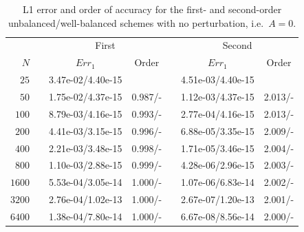 \begin{table}\centering
\caption{L1 error and order of accuracy for the first- and second-order unbalanced/well-balanced schemes with no perturbation, i.e.\ $A=0$.}
\label{table:OVS_A0}
\begin{tabular}{@{}rcccccc@{}}\toprule
& \phantom{a} & \multicolumn{2}{c}{First} & \phantom{ab} & \multicolumn{2}{c}{Second}\\
\cmidrule{3-4} \cmidrule{6-7}
$N$ && $Err_1$ & Order && $Err_1$ & Order\\ \midrule
$25$ && 3.47e-02/4.40e-15 &&& 4.51e-03/4.40e-15 &\\
$50$ && 1.75e-02/4.37e-15 & 0.987/- && 1.12e-03/4.37e-15 & 2.013/-\\
$100$ && 8.79e-03/4.16e-15 & 0.993/- && 2.77e-04/4.16e-15 & 2.013/-\\
$200$ && 4.41e-03/3.15e-15 & 0.996/- && 6.88e-05/3.35e-15 & 2.009/-\\
$400$ && 2.21e-03/3.48e-15 & 0.998/- && 1.71e-05/3.46e-15 & 2.004/-\\
$800$ && 1.10e-03/2.88e-15 & 0.999/- && 4.28e-06/2.96e-15 & 2.003/-\\
$1600$ && 5.53e-04/3.05e-14 & 1.000/- && 1.07e-06/6.83e-14 & 2.002/-\\
$3200$ && 2.76e-04/1.02e-13 & 1.000/- && 2.67e-07/1.20e-13 & 2.001/-\\
$6400$ && 1.38e-04/7.80e-14 & 1.000/- && 6.67e-08/8.56e-14 & 2.000/-\\
\bottomrule
\end{tabular}
\end{table}


